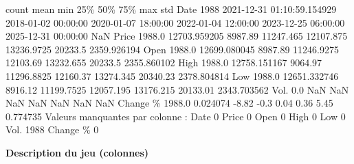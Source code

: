 \documentclass[
  10pt,
]{article}
\newenvironment{Shaded}{}{}
\newcommand{\NormalTok}[1]{#1}
\begin{document}
\begin{Shaded}
\begin{Highlighting}[]
\NormalTok{           count                        mean                  min                  25\%                  50\%                  75\%                  max          std}
\NormalTok{Date        1988  2021{-}12{-}31 01:10:59.154929  2018{-}01{-}02 00:00:00  2020{-}01{-}07 18:00:00  2022{-}01{-}04 12:00:00  2023{-}12{-}25 06:00:00  2025{-}12{-}31 00:00:00          NaN}
\NormalTok{Price     1988.0                12703.959205              8987.89            11247.465            12107.875           13236.9725              20233.5  2359.926194}
\NormalTok{Open      1988.0                12699.080045              8987.89           11246.9275             12103.69            13232.655              20233.5  2355.860102}
\NormalTok{High      1988.0                12758.151167              9064.97           11296.8825             12160.37            13274.345             20340.23  2378.804814}
\NormalTok{Low       1988.0                12651.332746              8916.12           11199.7525            12057.195            13176.215             20133.01  2343.703562}
\NormalTok{Vol.         0.0                         NaN                  NaN                  NaN                  NaN                  NaN                  NaN          NaN}
\NormalTok{Change \%  1988.0                    0.024074                {-}8.82                 {-}0.3                 0.04                 0.36                 5.45     0.774735}
\NormalTok{Valeurs manquantes par colonne :}
\NormalTok{Date           0}
\NormalTok{Price          0}
\NormalTok{Open           0}
\NormalTok{High           0}
\NormalTok{Low            0}
\NormalTok{Vol.        1988}
\NormalTok{Change \%       0}
\end{Highlighting}
\end{Shaded}

\textbf{Description du jeu (colonnes)}
\end{document}
